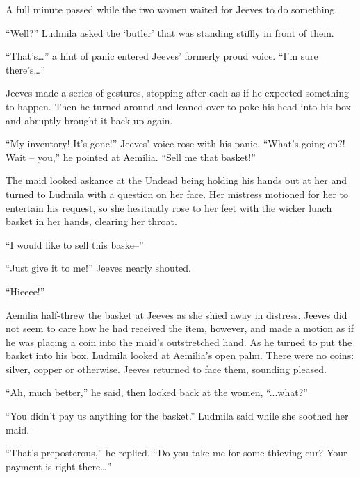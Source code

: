  

A full minute passed while the two women waited for Jeeves to do something.

 

“Well?” Ludmila asked the ‘butler’ that was standing stiffly in front of them.

 

“That’s…” a hint of panic entered Jeeves’ formerly proud voice. “I’m sure there’s…”

 

Jeeves made a series of gestures, stopping after each as if he expected something to happen. Then he turned around and leaned over to poke his head into his box and abruptly brought it back up again.

 

“My inventory! It’s gone!” Jeeves’ voice rose with his panic, “What's going on?! Wait – you,” he pointed at Aemilia. “Sell me that basket!”

 

The maid looked askance at the Undead being holding his hands out at her and turned to Ludmila with a question on her face. Her mistress motioned for her to entertain his request, so she hesitantly rose to her feet with the wicker lunch basket in her hands, clearing her throat.

 

“I would like to sell this baske–”

 

“Just give it to me!” Jeeves nearly shouted.

 

“Hieeee!”

 

Aemilia half-threw the basket at Jeeves as she shied away in distress. Jeeves did not seem to care how he had received the item, however, and made a motion as if he was placing a coin into the maid’s outstretched hand. As he turned to put the basket into his box, Ludmila looked at Aemilia’s open palm. There were no coins: silver, copper or otherwise. Jeeves returned to face them, sounding pleased.

 

“Ah, much better,” he said, then looked back at the women, “...what?”

 

“You didn’t pay us anything for the basket.” Ludmila said while she soothed her maid.

 

“That’s preposterous,” he replied. “Do you take me for some thieving cur? Your payment is right there…”

